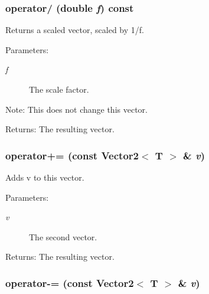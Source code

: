\subsubsection{ operator/ (double {\em f}) const\hspace{0.3cm}{\tt  [inline]}}\label{classEngine_1_1Vector2_19ef3f45fab6157bd4fd6751633e4a84}


Returns a scaled vector, scaled by 1/f. \begin{Desc}
\item[Parameters:]
\begin{description}
\item[{\em f}]The scale factor. \end{description}
\end{Desc}
\begin{Desc}
\item[Note:]This does not change this vector. \end{Desc}
\begin{Desc}
\item[Returns:]The resulting vector. \end{Desc}
\subsubsection{ operator+= (const {\bf Vector2}$<$ T $>$ \& {\em v})\hspace{0.3cm}{\tt  [inline]}}\label{classEngine_1_1Vector2_2c9752c6e77ec69027e74e6f32b843ed}


Adds v to this vector. \begin{Desc}
\item[Parameters:]
\begin{description}
\item[{\em v}]The second vector. \end{description}
\end{Desc}
\begin{Desc}
\item[Returns:]The resulting vector. \end{Desc}
\subsubsection{ operator-= (const {\bf Vector2}$<$ T $>$ \& {\em v})\hspace{0.3cm}{\tt  [inline]}}\label{classEngine_1_1Vector2_d24f8ab0726510292b4cd1781935556d}


